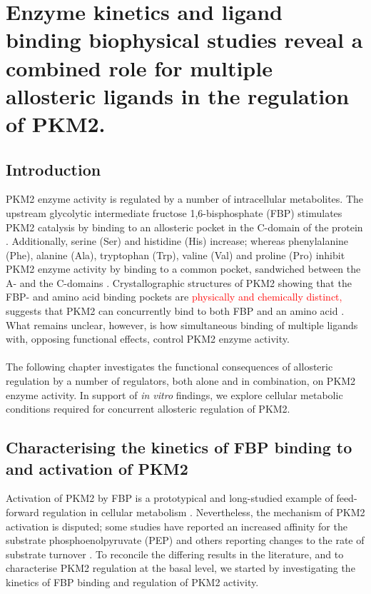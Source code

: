 \chapter{Enzyme kinetics and ligand binding biophysical studies reveal a combined role for multiple allosteric ligands in the regulation of PKM2.}
\label{chapter:enzyme_kinetics}


\section{Introduction}
PKM2 enzyme activity is regulated by a number of intracellular metabolites. The upstream glycolytic intermediate fructose 1,6-bisphosphate (FBP) stimulates PKM2 catalysis by binding to an allosteric pocket in the C-domain of the protein \cite{Ashizawa:1990aa,Ashizawa:1991aa,Dombrauckas:2005aa,Hofmann:1975aa}. Additionally, serine (Ser) and histidine (His) increase; whereas phenylalanine (Phe), alanine (Ala), tryptophan (Trp), valine (Val) and proline (Pro) inhibit PKM2 enzyme activity by binding to a common pocket, sandwiched between the A- and the C-domains \cite{Ashizawa:1991aa,Chaneton:2012aa,Eigenbrodt:1983aa,Morgan:2013aa,Yuan:2018aa}. Crystallographic structures of PKM2 showing that the FBP- and amino acid binding pockets are \textcolor{red}{physically and chemically distinct,} suggests that PKM2 can concurrently bind to both FBP and an amino acid \cite{Chaneton:2012aa}. What remains unclear, however, is how simultaneous binding of multiple ligands with, opposing functional effects, control PKM2 enzyme activity.
%
% 
\\\\
%
%
The following chapter investigates the functional consequences of allosteric regulation by a number of regulators, both alone and in combination, on PKM2 enzyme activity. In support of \textit{in vitro} findings, we explore cellular metabolic conditions required for concurrent allosteric regulation of PKM2.
\clearpage

\section{Characterising the kinetics of FBP binding to and activation of PKM2}
Activation of PKM2 by FBP is a prototypical and long-studied example of feed-forward regulation in cellular metabolism \cite{Koler:1968aa}. Nevertheless, the mechanism of PKM2 activation is disputed; some studies have reported an increased affinity for the substrate phosphoenolpyruvate (PEP) \cite{Boxer:2010aa,Chaneton:2012aa,Jiang:2010aa,Walsh:2011aa} and others reporting changes to the rate of substrate turnover \cite{Morgan:2013aa,Yuan:2018aa}. To reconcile the differing results in the literature, and to characterise PKM2 regulation at the basal level, we started by investigating the kinetics of FBP binding and regulation of PKM2 activity.


